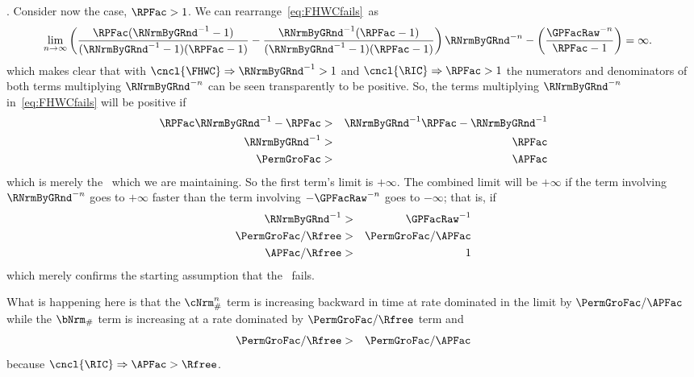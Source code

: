 \documentclass[\econtexRoot/BufferStockTheory]{subfiles}
\begin{document}
.
Consider now the \cncl{\RIC} case, $\RPFac > 1$.
We can rearrange~\eqref{eq:FHWCfails}~as
\begin{eqnarray}
  \lim_{n \rightarrow \infty} \left(\frac{\RPFac(\RNrmByGRnd^{-1}-1)}{(\RNrmByGRnd^{-1}-1)(\RPFac-1)}-\frac{\RNrmByGRnd^{-1}(\RPFac-1)}{(\RNrmByGRnd^{-1}-1)(\RPFac-1)}\right)\RNrmByGRnd^{-n}-\left(\frac{\GPFacRaw^{-n}}{\RPFac-1}\right)  & = \infty.  
\end{eqnarray}
which makes clear that with $\cncl{\FHWC} \Rightarrow \RNrmByGRnd^{-1} > 1$ and $\cncl{\RIC} \Rightarrow \RPFac > 1$ the numerators and denominators of both terms multiplying $\RNrmByGRnd^{-n}$ can be seen transparently to be positive.
So, the terms multiplying
$\RNrmByGRnd^{-n}$ in~\eqref{eq:FHWCfails} will be positive if
\begin{eqnarray*}
  \RPFac \RNrmByGRnd^{-1} - \RPFac  & > & \RNrmByGRnd^{-1}\RPFac-\RNrmByGRnd^{-1}
  \\ \RNrmByGRnd^{-1}  & > & \RPFac
  \\ \PermGroFac  & > & \APFac
\end{eqnarray*}
which is merely the \GICRaw~which we are maintaining.
So the first term's limit is $+\infty$.
The
combined limit will be $+\infty$ if the term involving $\RNrmByGRnd^{-n}$
goes to $+\infty$ faster than the term involving $-\GPFacRaw^{-n}$ goes to
$-\infty$; that is, if
\begin{eqnarray*}
  \RNrmByGRnd^{-1}  & > & \GPFacRaw^{-1}
  \\ \PermGroFac/\Rfree  & > & \PermGroFac/\APFac
  \\ \APFac/\Rfree  & > & 1
\end{eqnarray*}
which merely confirms the starting assumption that the \RIC~fails.

What is happening here is that the $\cNrm_{\#}^{n}$ term is increasing backward in time at rate dominated in the limit by $\PermGroFac/\APFac$ while the $\bNrm_{\#}$ term is increasing at a rate dominated by $\PermGroFac/\Rfree$ term and
\begin{eqnarray}
  \PermGroFac/\Rfree & > & \PermGroFac/\APFac 
\end{eqnarray}
because $\cncl{\RIC} \Rightarrow \APFac > \Rfree$.
\end{document}
